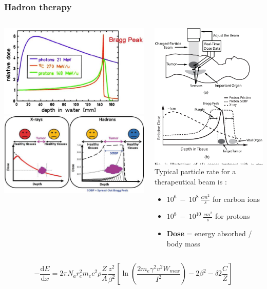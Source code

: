 \documentclass[aspectratio=169]{beamer}
\begin{document}
	\begin{frame}
	\frametitle{Hadron therapy}
	\begin{columns}
		\begin{center}
			\includegraphics[width=0.75 \textwidth]{IMG/Bragg_Peak.PNG}
			\includegraphics[width=0.65 \textwidth]{IMG/Bragg_Peak2.PNG}
		\end{center}
		\begin{center}
			\includegraphics[width=0.3 \textwidth]{IMG/HadroTherapy.PNG}
			\newline
			Typical particle rate for a therapeutical beam is :
			\begin{itemize}
				\item $10^6 \:- \: 10^8 \: \frac{cm^2}{s}$ for carbon ions
				\item $10^8 \:- \: 10^{10} \: \frac{cm^2}{s}$ for protons
				\item \textbf{Dose} = energy absorbed / body mass
			\end{itemize}
		\end{center}
	\end{columns}
	\begin{center}
		\begin{equation}
			-\dfrac{\mathrm dE}{\mathrm dx} = 2 \pi N_{a} r_{e}^{2} m_{e} c^{2} \rho \dfrac{Z}{A}  \dfrac{z^{2}}{\beta^{2}}\left[\ln\left(\dfrac{2m_{e} \gamma ^{2} v^{2} W_{max}}{I^{2}}\right) - 2\beta^{2} - \delta 2\frac{C}{Z}\right]
		\end{equation}
	\end{center}
	
	\end{frame}
\end{document}

